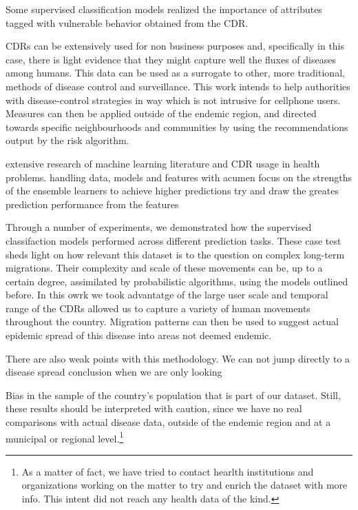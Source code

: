 Some supervised classification models realized the importance of attributes tagged with vulnerable behavior obtained from the CDR.



CDRs can be extensively used for non business purposes and, specifically in this case, there is light evidence that they might capture well the fluxes of diseases among humans.
This data can be used as a surrogate to other, more traditional, methods of disease control and surveillance.
This work intends to help authorities with disease-control strategies in way which is not intrusive for cellphone users.
Measures can then be applied outside of the endemic region, and directed towards specific neighbourhoods and communities by using the recommendations output by the risk algorithm.





extensive research of machine learning literature and CDR usage in health problems.
handling data, models and features with acumen
focus on the strengths of the ensemble learners to achieve higher predictions
try and draw the greates prediction performance from the features


Through a number of experiments, we demonstrated how the supervised classifaction models performed across different prediction tasks.
These case test sheds light on how relevant this dataset is to the question on complex long-term migrations.
Their complexity and scale of these movements can be, up to a certain degree, assimilated by probabilistic algorithms, using the models outlined before.
In this owrk we took advantatge of the large user scale and temporal range of the CDRs allowed us to capture a variety of human movements throughout the country.
Migration patterns can then be used to suggest actual epidemic spread of this disease into areas not deemed endemic.


There are also weak points with this methodology. We can not jump directly to a disease spread conclusion when we are only looking

Bias in the sample of the country's population that is part of our dataset.
Still, these results should be interpreted with caution, since we have no real comparisons with actual disease data, outside of the endemic region and at a municipal or regional level.\footnote{As a matter of fact, we have tried to contact hearlth institutions and organizations working on the matter to try and enrich the dataset with more info. This intent did not reach any health data of the kind.}

